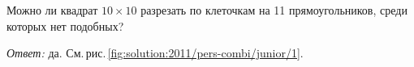 \problem
Можно ли квадрат $10 \times 10$ разрезать по клеточкам на 11 прямоугольников,
среди которых нет подобных?

%
\label{solution:2011/pers-combi/junior/1}%
\emph{Ответ:} да.
См.\,рис.\,\ref{fig:solution:2011/pers-combi/junior/1}.

\endproblem
